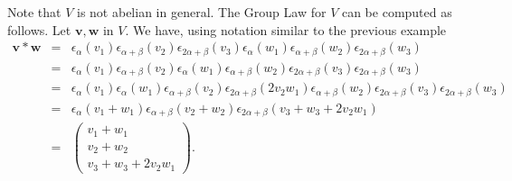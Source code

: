 Note that $V$ is not abelian in general. The Group Law for $V$ can be computed as follows. Let $\mathbf{v}, \mathbf{w}$ in $V$. We have, using notation similar to the previous example
\begin{eqnarray*}
\mathbf{v}*\mathbf{w}
&=& 
\epsilon_\alpha(v_1)\epsilon_{\alpha+\beta}(v_2)\epsilon_{2\alpha+\beta}(v_3) \epsilon_\alpha(w_1)\epsilon_{\alpha+\beta}(w_2)\epsilon_{2\alpha+\beta}(w_3)\\
&=& 
\epsilon_\alpha(v_1)\epsilon_{\alpha+\beta}(v_2) \epsilon_\alpha(w_1)\epsilon_{\alpha+\beta}(w_2)\epsilon_{2\alpha+\beta}(v_3)\epsilon_{2\alpha+\beta}(w_3)\\
&=& 
\epsilon_\alpha(v_1) \epsilon_\alpha(w_1) \epsilon_{\alpha + \beta}(v_2)\epsilon_{2\alpha+\beta}(2v_2w_1)\epsilon_{\alpha+\beta}(w_2)\epsilon_{2\alpha+\beta}(v_3)\epsilon_{2\alpha+\beta}(w_3)\\
&=& 
\epsilon_\alpha(v_1 + w_1) \epsilon_{\alpha + \beta}(v_2 + w_2)\epsilon_{2\alpha+\beta}(v_3 + w_3 + 2v_2w_1)\\
&=&
\left(\begin{matrix}
v_1 + w_1 \\
v_2 + w_2 \\
v_3 + w_3 + 2v_2w_1
\end{matrix}\right).
\end{eqnarray*}

